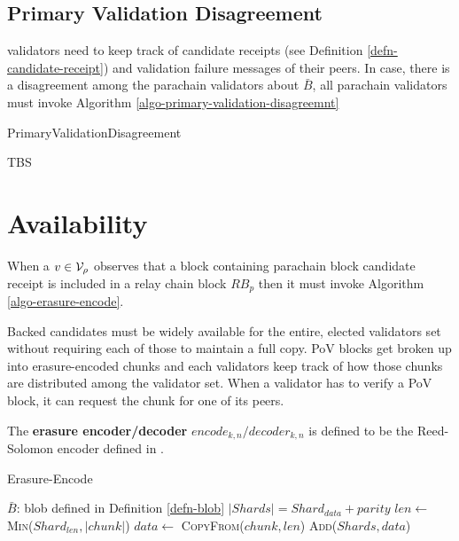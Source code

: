 

\subsection{Primary Validation Disagreement}
\label{sect-primary-validation-disagreemnt}
 validators need to keep track of candidate receipts
(see Definition \ref{defn-candidate-receipt}) and validation failure messages of
their peers. In case, there is a disagreement among the parachain validators
about $\bar{B}$, all parachain validators must invoke Algorithm
\ref{algo-primary-validation-disagreemnt}

\begin{algorithm}[H]
  \caption[]{\sc PrimaryValidationDisagreement}
  \label{algo-primary-validation-disagreemnt}
  \begin{algorithmic}[1]
    \Require{}

    \State TBS
  \end{algorithmic}
\end{algorithm}

\section{Availability}

When a $v \in \mathcal{V}_\rho$ observes that a block containing parachain block
candidate receipt is included in a relay chain block $RB_p$ then it must invoke
Algorithm \ref{algo-erasure-encode}.
\newline

Backed candidates must be widely available for the entire, elected validators
set without requiring each of those to maintain a full copy. PoV blocks get
broken up into erasure-encoded chunks and each validators keep track of how
those chunks are distributed among the validator set. When a validator has to
verify a PoV block, it can request the chunk for one of its peers.

\begin{definition}
  \label{defn-erasure-encoder-decoder}
  The {\bf erasure encoder/decoder} {\bf $encode_{k,n}/decoder_{k,n}$ } is
  defined to be the Reed-Solomon encoder defined in \cite{??}.
\end{definition}

\begin{algorithm}[H]
  \caption[]{\sc Erasure-Encode}
  \label{algo-erasure-encode}
  \begin{algorithmic}[1]
    \Require
    $\bar{B}$: blob defined in Definition \ref{defn-blob}
    \State $|Shards| = Shard_{data} + {parity}$
      \State $len \leftarrow$ \textsc{Min}($Shard_{len}, |chunk|$)
      \State $data \leftarrow$ \textsc{CopyFrom}($chunk, len$)
      \State \textsc{Add}($Shards, data$)
    \EndFor
  \end{algorithmic}
\end{algorithm}

